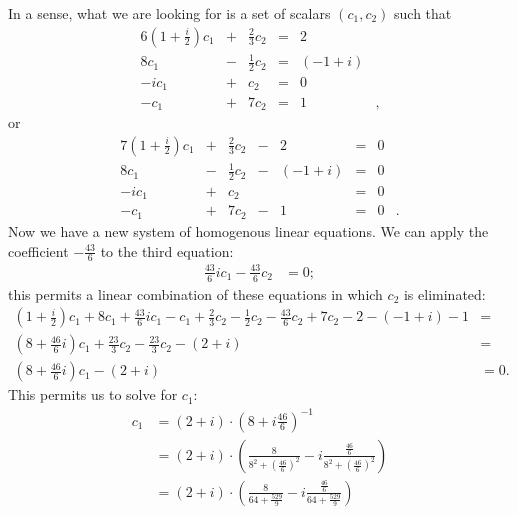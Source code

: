 \documentclass[12pt]{article}
\begin{document}
\begin{enumerate}
      In a sense, what we are looking for is a set of scalars
      $(c_1,c_2)$ such that
      \begin{alignat*}{6}
        (1 + \frac{i}{2})c_1 & {}+{} & \frac{2}{3}c_2 & {}={} &        2&\\
                        8c_1 & {}-{} & \frac{1}{2}c_2 & {}={} & (-1 + i)&\\
                       -ic_1 & {}+{} &            c_2 & {}={} &        0&\\
                        -c_1 & {}+{} &           7c_2 & {}={} &        1&,
      \end{alignat*}
      or
      \begin{alignat*}{7}
        (1 + \frac{i}{2})c_1 & {}+{} & \frac{2}{3}c_2 & {}-{} &       2 & {}={} & 0&\\
                        8c_1 & {}-{} & \frac{1}{2}c_2 & {}-{} &(-1 + i) & {}={} & 0&\\
                       -ic_1 & {}+{} &            c_2 & {} {} &         & {}={} & 0&\\
                        -c_1 & {}+{} &           7c_2 & {}-{} &       1 & {}={} & 0&.
      \end{alignat*}
      Now we have a new system of homogenous linear equations. We
      can apply the coefficient $-\frac{43}{6}$ to the third
      equation:
      \begin{align*}
        \frac{43}{6}ic_1 -\frac{43}{6}c_2 &= 0;
      \end{align*}
      this permits a linear combination of these equations in
      which $c_2$ is eliminated:
      \begin{align*}
        (1 + \frac{i}{2})c_1 + 8c_1 + \frac{43}{6}ic_1 - c_1
        + \frac{2}{3}c_2 - \frac{1}{2}c_2 - \frac{43}{6}c_2 + 7c_2
        - 2 -(-1 + i) - 1 &=\\
        (8 + \frac{46}{6}i)c_1
        + \frac{23}{3}c_2 - \frac{23}{3}c_2
        - (2 + i) &=\\
        (8 + \frac{46}{6}i)c_1
        - (2 + i) &=0.
      \end{align*}
      This permits us to solve for $c_1$:
      \begin{align*}
        c_1 &= (2 + i) \cdot (8 + i\frac{46}{6})^{-1}\\
        &= (2 + i) \cdot (\frac{8}{8^2 + (\frac{46}{6})^2} - i\frac{\frac{46}{6}}{8^2 + (\frac{46}{6})^2})\\
        &= (2 + i) \cdot (\frac{8}{64 + \frac{529}{9}} - i\frac{\frac{46}{6}}{64 + \frac{529}{9}})\\

\end{align*}
\end{enumerate}
\end{document}
